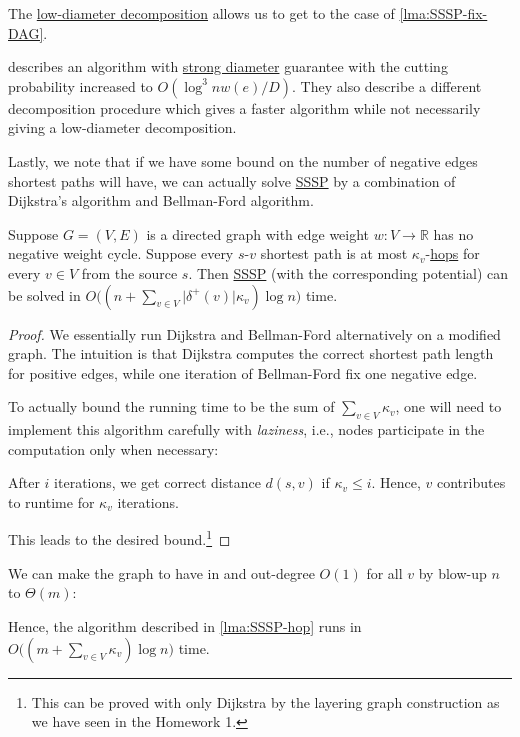 \begin{intuition}
	The \hyperref[thm:directed-LDD]{low-diameter decomposition} allows us to get to the case of \autoref{lma:SSSP-fix-DAG}.
\end{intuition}

\begin{remark}
	\cite{bringmann2023negative} describes an algorithm with \hyperref[not:strong-diameter]{strong diameter} guarantee with the cutting probability increased to \(O(\log ^3 n w(e) / D)\). They also describe a different decomposition procedure which gives a faster algorithm while not necessarily giving a low-diameter decomposition.
\end{remark}

Lastly, we note that if we have some bound on the number of negative edges shortest paths will have, we can actually solve \hyperref[prb:SSSP]{SSSP} by a combination of Dijkstra's algorithm and Bellman-Ford algorithm.

\begin{lemma}\label{lma:SSSP-hop}
	Suppose \(G = (V, E)\) is a directed graph with edge weight \(w \colon V \to \mathbb{R} \) has no negative weight cycle. Suppose every \(s\)-\(v\) shortest path is at most \(\kappa _v\)-\hyperref[not:hop]{hops} for every \(v \in V\) from the source \(s\). Then \hyperref[prb:SSSP]{SSSP} (with the corresponding potential) can be solved in \(O\big( (n + \sum_{v \in V} \lvert \delta ^+(v) \rvert \kappa _v ) \log n \big)\) time.
\end{lemma}
\begin{proof}
	We essentially run Dijkstra and Bellman-Ford alternatively on a modified graph. The intuition is that Dijkstra computes the correct shortest path length for positive edges, while one iteration of Bellman-Ford fix one negative edge.
	\begin{center}
	\end{center}
	To actually bound the running time to be the sum of \(\sum_{v \in V} \kappa _v\), one will need to implement this algorithm carefully with \emph{laziness}, i.e., nodes participate in the computation only when necessary:
	\begin{claim}
		After \(i\) iterations, we get correct distance \(d(s, v)\) if \(\kappa _v \leq i\). Hence, \(v\) contributes to runtime for \(\kappa _v\) iterations.
	\end{claim}
	This leads to the desired bound.\footnote{This can be proved with only Dijkstra by the layering graph construction as we have seen in the Homework 1.}
\end{proof}

\begin{remark}
	We can make the graph to have in and out-degree \(O(1)\) for all \(v\) by blow-up \(n\) to \(\Theta (m)\):
	\begin{center}
	\end{center}
	Hence, the algorithm described in \autoref{lma:SSSP-hop} runs in \(O\big((m + \sum_{v \in V} \kappa _v) \log n \big)\) time.
\end{remark}